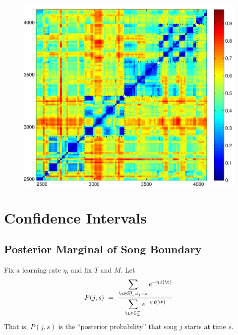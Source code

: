 \documentclass[twocolumn]{article}
\DeclareMathOperator{\loss}{\ell}
\newcommand{\segs}{\mathbb S}
\begin{document}
	\begin{figure}[t]
		\centering
		\includegraphics[width=\textwidth]{images/simmat_preds}
		
		\caption{ }
		\label{fig:predictions}
	\end{figure} 
	
\section{Confidence Intervals}\label{sec:confidence-intervals}
	
	
	\subsection{Posterior Marginal of Song Boundary}
	Fix a learning rate $\eta$, and fix $T$ and $M$. Let
	\[
	P(j,s) ~=~ 
	\frac{\displaystyle
		\sum_{\t \in \segs^T_m : t_j = s} e^{- \eta \loss(\t)}
	}{\displaystyle
	\sum_{\t \in \segs^T_m} e^{- \eta \loss(\t)}
}
\]
That is, $P(j,s)$ is the ``posterior probability'' that song $j$ starts at time $s$.
\end{document}
